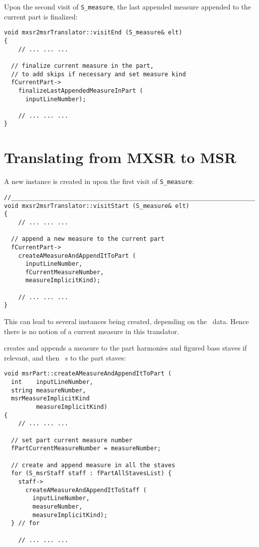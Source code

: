 Upon the second visit of {\tt S_measure}, the last appended measure appended to the current part is finalized:
\begin{lstlisting}[language=CPlusPlus]
void mxsr2msrTranslator::visitEnd (S_measure& elt)
{
	// ... ... ...

  // finalize current measure in the part,
  // to add skips if necessary and set measure kind
  fCurrentPart->
    finalizeLastAppendedMeasureInPart (
      inputLineNumber);

	// ... ... ...
}
\end{lstlisting}


\section{Translating from MXSR to MSR}

A new  instance is created in  upon the first visit of {\tt S_measure}:
\begin{lstlisting}[language=CPlusPlus]
//________________________________________________________________________
void mxsr2msrTranslator::visitStart (S_measure& elt)
{
	// ... ... ...

  // append a new measure to the current part
  fCurrentPart->
    createAMeasureAndAppendItToPart (
      inputLineNumber,
      fCurrentMeasureNumber,
      measureImplicitKind);

	// ... ... ...
}
\end{lstlisting}

This can lead to several  instances being created, depending on the \mxml\ data. Hence there is no notion of a current measure in this translator.

 creates and appends a measure to the part harmonies and figured bass staves if relevant, and then \cascade\ s to the part staves:
\begin{lstlisting}[language=CPlusPlus]
void msrPart::createAMeasureAndAppendItToPart (
  int    inputLineNumber,
  string measureNumber,
  msrMeasureImplicitKind
         measureImplicitKind)
{
	// ... ... ...

  // set part current measure number
  fPartCurrentMeasureNumber = measureNumber;

  // create and append measure in all the staves
  for (S_msrStaff staff : fPartAllStavesList) {
    staff->
      createAMeasureAndAppendItToStaff (
        inputLineNumber,
        measureNumber,
        measureImplicitKind);
  } // for

	// ... ... ...
\end{lstlisting}



